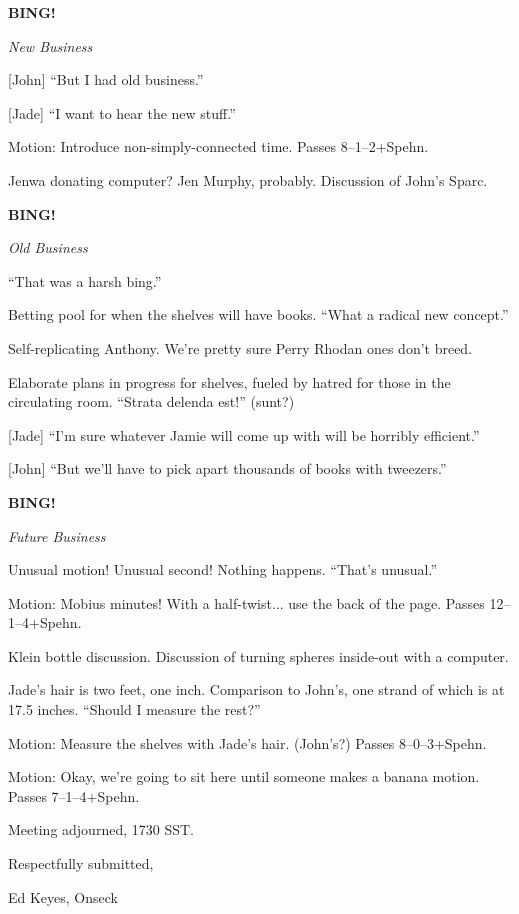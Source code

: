 \documentclass[12pt]{article}
\newcommand{\bing}{{\bf BING!} }
\newcommand{\goto}[1]{\bing \vskip 12pt \centerline{{\em{#1}}}}
\begin{document}
\goto{New Business}

[John] ``But I had old business.''

[Jade] ``I want to hear the new stuff.''

Motion: Introduce non-simply-connected time.  Passes 8--1--2+Spehn.

Jenwa donating computer?  Jen Murphy, probably.  Discussion of John's
Sparc.

\goto{Old Business}

``That was a harsh bing.''

Betting pool for when the shelves will have books.  ``What a radical
new concept.''

Self-replicating Anthony.  We're pretty sure Perry Rhodan ones don't
breed.

Elaborate plans in progress for shelves, fueled by hatred for those
in the circulating room.  ``Strata delenda est!''  (sunt?)

[Jade] ``I'm sure whatever Jamie will come up with will be horribly
efficient.''

[John] ``But we'll have to pick apart thousands of books with tweezers.''

\goto{Future Business}

Unusual motion!  Unusual second!  Nothing happens.  ``That's unusual.''

Motion: Mobius minutes!  With a half-twist... use the back of the page.
Passes 12--1--4+Spehn.

Klein bottle discussion.  Discussion of turning spheres inside-out
with a computer.

Jade's hair is two feet, one inch.  Comparison to John's, one strand
of which is at 17.5 inches.  ``Should I measure the rest?''

Motion: Measure the shelves with Jade's hair.  (John's?)  Passes
8--0--3+Spehn.

Motion: Okay, we're going to sit here until someone makes a banana
motion.  Passes 7--1--4+Spehn.

\vspace{12pt}

\noindent
Meeting adjourned, 1730 SST.

\vspace{18pt}

\centerline{Respectfully submitted,}
\centerline{Ed Keyes, Onseck}
\end{document}

